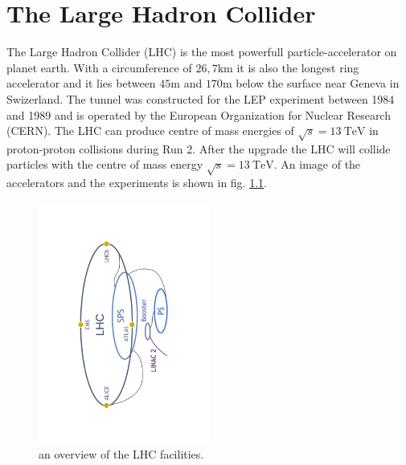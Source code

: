 \chapter{The Large Hadron Collider\cite{lhcInfo}}
\label{sec:lhcb}

The Large Hadron Collider (LHC) is the most powerfull particle-accelerator on planet earth. With a circumference of $26,7\si{\kilo\metre}$ it is also the longest ring accelerator and it lies between $45\si{\metre}$ and $170\si{\metre}$ below the surface near Geneva in Swizerland. The tunnel was constructed for the LEP experiment between 1984 and 1989 and is operated by the European Organization for Nuclear Research (CERN). The LHC can produce centre of mass energies of $\sqrt{s} = \SI{13}{\tera\electronvolt}$ in proton-proton collisions during Run 2. After the upgrade the LHC will collide particles with the centre of mass energy $\sqrt{s} = \SI{13}{\tera\electronvolt}$.
An image of the accelerators and the experiments is shown in fig. \ref{fig:CERN}\cite{facilityCERN}.

\begin{figure}
  \centering
  \includegraphics[angle=-90, origin=c, width=0.5\textwidth]{plots/CERN_layout.pdf}
  \caption{an overview of the LHC facilities.}
  \label{fig:CERN}
\end{figure}

